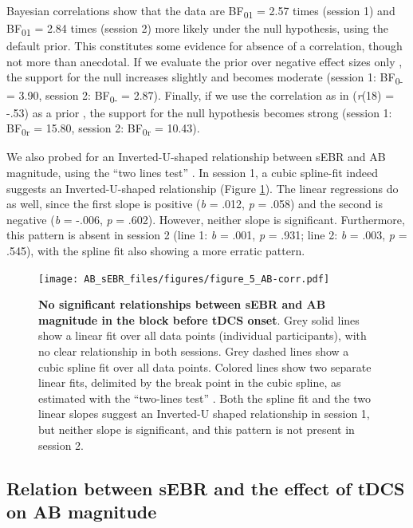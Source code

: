 \documentclass[11pt,]{memoir}
\begin{document}
Bayesian correlations show that the data are BF\textsubscript{01} = 2.57 times (session 1) and BF\textsubscript{01} = 2.84 times (session 2) more likely under the null hypothesis, using the default prior. This constitutes some evidence for absence of a correlation, though not more than anecdotal. If we evaluate the prior over negative effect sizes only \autocite[based on the negative correlation in][]{Colzato2008}, the support for the null increases slightly and becomes moderate (session 1: BF\textsubscript{0-} = 3.90, session 2: BF\textsubscript{0-} = 2.87). Finally, if we use the correlation as in \textcite{Colzato2008} (\emph{r}(18) = -.53) as a prior \autocite{Wagenmakers2016}, the support for the null hypothesis becomes strong (session 1: BF\textsubscript{0r} = 15.80, session 2: BF\textsubscript{0r} = 10.43).

We also probed for an Inverted-U-shaped relationship between sEBR and AB magnitude, using the ``two lines test'' \autocite{Simonsohn2018}. In session 1, a cubic spline-fit indeed suggests an Inverted-U-shaped relationship (Figure \ref{fig:fig-AB-corr}). The linear regressions do as well, since the first slope is positive (\emph{b} = .012, \emph{p} = .058) and the second is negative (\emph{b} = -.006, \emph{p} = .602). However, neither slope is significant. Furthermore, this pattern is absent in session 2 (line 1: \emph{b} = .001, \emph{p} = .931; line 2: \emph{b} = .003, \emph{p} = .545), with the spline fit also showing a more erratic pattern.

\begin{figure}
\centering
\texttt{[image: AB\_sEBR\_files/figures/figure\_5\_AB-corr.pdf]}
\caption{\label{fig:fig-AB-corr}\textbf{No significant relationships between sEBR and AB magnitude in the block before tDCS onset}. Grey solid lines show a linear fit over all data points (individual participants), with no clear relationship in both sessions. Grey dashed lines show a cubic spline fit over all data points. Colored lines show two separate linear fits, delimited by the break point in the cubic spline, as estimated with the ``two-lines test'' \autocite{Simonsohn2018}. Both the spline fit and the two linear slopes suggest an Inverted-U shaped relationship in session 1, but neither slope is significant, and this pattern is not present in session 2.}
\end{figure}



\hypertarget{relation-between-sebr-and-the-effect-of-tdcs-on-ab-magnitude-1}{%
\subsection{Relation between sEBR and the effect of tDCS on AB magnitude}\label{relation-between-sebr-and-the-effect-of-tdcs-on-ab-magnitude-1}}
\end{document}
